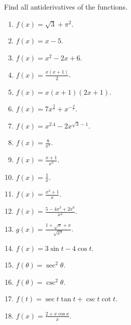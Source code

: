 Find all antiderivatives of the functions.
\begin{multicols}{3}
\begin{enumerate}
\item $\displaystyle f(x)=\sqrt {3}+\pi^2$.

\item $\displaystyle f(x)=x-5$.


\item $\displaystyle f(x)= x^2-2x+6$.


\item $\displaystyle f(x)=\frac{x(x+1)}{2} $.


\item $\displaystyle f(x)=x(x+1)(2x+1)$.


\item $\displaystyle f(x)=7x^{\frac{2}{7}}+x^{-\frac{4}{7}}$.
\item $\displaystyle f(x)=x^{2.4}-2x^{\sqrt{3}-1}$.
\item $\displaystyle f(x)=\frac{8}{x^7}$.
\item $\displaystyle f(x)=\frac{x+1}{x^3}$.

\item $\displaystyle f(x)=\frac{1}{x}$.
\item $\displaystyle f(x)=\frac{x^2+1}{x}$.

\item $\displaystyle f(x)=\frac{5-4x^3+2x^6}{x^4}$.

\item $\displaystyle g(x)=\frac{1+\sqrt{x}+x}{\sqrt{x^3}}$.
\item $\displaystyle f(x)=3\sin t-4\cos t$.

\item $\displaystyle f(\theta)=\sec^2\theta$.
\item $\displaystyle f(\theta)=\csc^2\theta$.

\item $\displaystyle f(t)=\sec t \tan t +\csc t \cot t$.
\item $\displaystyle f(x)=\frac{2+x\cos x}{x}$.

\end{enumerate}
\end{multicols}
